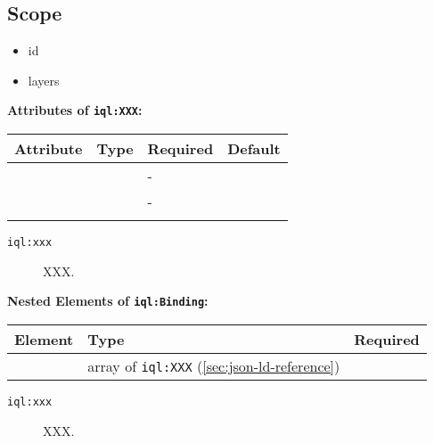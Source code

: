 \documentclass[11pt]{article}
\newcommand{\iqlns}{iql:}
\newcommand{\iqlType}[1]{\texttt{\iqlns#1}}
\newcommand{\attributes}[1]{\noindent\textbf{Attributes of \iqlType{#1}:}\newline\medskip}
\newcommand{\elements}[1]{\noindent\textbf{Nested Elements of \iqlType{#1}:}\newline\medskip}
\begin{document}
\subsection{Scope}
\label{sec:json-ld-scope}
\begin{itemize}
\item id
\item layers
\end{itemize}
\attributes{XXX}
\begin{tabular}{|p{}|p{}|p{}|p{}|}
	\hline
	\textbf{Attribute} & \textbf{Type} & \textbf{Required} & \textbf{Default} \\ 
	\hline
	\hline
	&  & - &  \\ 
	\hline 
	&  & - &  \\ 
	\hline 
	&  &  & \\ 
	\hline 
\end{tabular}
\begin{description}
	\item[\iqlType{xxx}] XXX.
\end{description}
\elements{Binding}
\begin{tabular}{|p{}|p{}|p{}|}
	\hline
	\textbf{Element} & \textbf{Type} & \textbf{Required} \\ 
	\hline
	\hline 
	& array of \iqlType{XXX} (\ref{sec:json-ld-reference}) &  \\ 
	\hline 
\end{tabular}
\begin{description}
	\item[\iqlType{xxx}] XXX.
\end{description}

\end{document}
